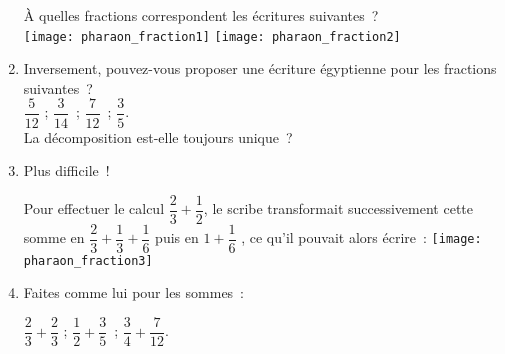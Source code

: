 \begin{TP}
\begin{enumerate}
À quelles fractions correspondent les écritures suivantes ? \\[0.5em]
\texttt{[image: pharaon\_fraction1]} \qquad \qquad \texttt{[image: pharaon\_fraction2]} \hfill

 \item Inversement, pouvez-vous proposer une écriture égyptienne pour les fractions suivantes ? \\[0.5em]
 $\dfrac{5}{12}$ ; $\dfrac{3}{14}$ ; $\dfrac{7}{12}$ ; $\dfrac{3}{5}$. \\[0.5em]
La décomposition est-elle toujours unique ?
\vspace{0.3cm}
 \item Plus difficile !
 
Pour effectuer le calcul $\dfrac{2}{3} + \dfrac{1}{2}$, le scribe transformait successivement cette somme en $\dfrac{2}{3} + \dfrac{1}{3} + \dfrac{1}{6}$ puis en $1 + \dfrac{1}{6}$ , ce qu'il pouvait alors écrire : \quad \texttt{[image: pharaon\_fraction3]} \\[0.5em]
 \item Faites comme lui pour les sommes : \\[0.5em]
\begin{center} $\dfrac{2}{3} + \dfrac{2}{3}$ ; $\dfrac{1}{2} + \dfrac{3}{5}$ ; $\dfrac{3}{4} + \dfrac{7}{12}$. \end{center}
 \end{enumerate}

\end{TP}